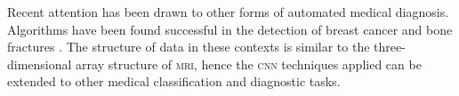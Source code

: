 Recent attention has been drawn to other forms of automated medical diagnosis. Algorithms have been found successful in the detection of breast cancer \citep{LiuYun2018} and bone fractures \citep{Lindsey2018}. The structure of data in these contexts is similar to the three-dimensional array structure of \textsc{mri}, hence the \textsc{cnn} techniques applied can be extended to other medical classification and diagnostic tasks.
 

%
%
